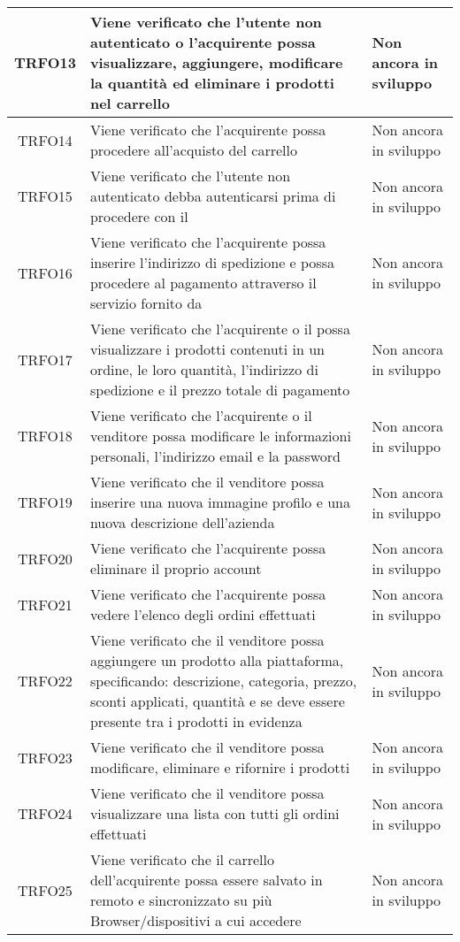 \begin{longtable}{|c| C{10cm} |C{3cm}|}
    TRFO13 & Viene verificato che l'utente non autenticato o l'acquirente possa visualizzare, aggiungere, modificare la quantità ed eliminare i prodotti nel carrello & Non ancora in sviluppo \\ \hline
    TRFO14 & Viene verificato che l'acquirente possa procedere all'acquisto del carrello & Non ancora in sviluppo \\ \hline
    TRFO15 & Viene verificato che l'utente non autenticato debba autenticarsi prima di procedere con il  & Non ancora in sviluppo \\ \hline
    TRFO16 & Viene verificato che l'acquirente possa inserire l'indirizzo di spedizione e possa procedere al pagamento attraverso il servizio fornito da  & Non ancora in sviluppo \\ \hline
	TRFO17 & Viene verificato che l'acquirente o il  possa visualizzare i prodotti contenuti in un ordine, le loro quantità, l'indirizzo di spedizione e il prezzo totale di pagamento & Non ancora in sviluppo \\ \hline
	TRFO18 & Viene verificato che l'acquirente o il venditore possa modificare le informazioni personali, l'indirizzo email e la password & Non ancora in sviluppo \\ \hline
	TRFO19 & Viene verificato che il venditore possa inserire una nuova immagine profilo e una nuova descrizione dell'azienda & Non ancora in sviluppo \\ \hline
	TRFO20 & Viene verificato che l'acquirente possa eliminare il proprio account & Non ancora in sviluppo \\ \hline
	TRFO21 & Viene verificato che l'acquirente possa vedere l'elenco degli ordini effettuati & Non ancora in sviluppo \\ \hline
	TRFO22 & Viene verificato che il venditore possa aggiungere un prodotto alla piattaforma, specificando: descrizione, categoria, prezzo, sconti applicati, quantità e se deve essere presente tra i prodotti in evidenza & Non ancora in sviluppo \\ \hline
    TRFO23 & Viene verificato che il venditore possa modificare, eliminare e rifornire i prodotti & Non ancora in sviluppo \\ \hline
    TRFO24 & Viene verificato che il venditore possa visualizzare una lista con tutti gli ordini effettuati & Non ancora in sviluppo \\ \hline
    TRFO25 & Viene verificato che il carrello dell'acquirente possa essere salvato in remoto e sincronizzato su più Browser/dispositivi a cui accedere & Non ancora in sviluppo \\ \hline

\end{longtable}
